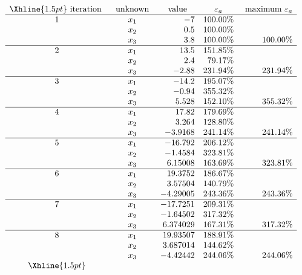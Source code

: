 \documentclass[../main.tex]{subfiles}
\begin{document}
\begin{enumerate}[label=\bfseries(\alph*)]
$\begin{array}{ccrrr}
\Xhline{1.5pt}\text { iteration } & \text { unknown } & \multicolumn{1}{c}{\text { value }} & \multicolumn{1}{c}{\varepsilon_{a}} & \text { maximum } \varepsilon_{a} \\
\hline 1 & x_{1} & -7 & 100.00 \% & \\
& x_{2} & 0.5 & 100.00 \% & \\
& x_{3} & 3.8 & 100.00 \% & 100.00 \% \\
\hline 2 & x_{1} & 13.5 & 151.85 \% & \\
& x_{2} & 2.4 & 79.17 \% & \\
& x_{3} & -2.88 & 231.94 \% & 231.94 \% \\
\hline 3 & x_{1} & -14.2 & 195.07 \% & \\
& x_{2} & -0.94 & 355.32 \% & \\
& x_{3} & 5.528 & 152.10 \% & 355.32 \% \\
\hline 4 & x_{1} & 17.82 & 179.69 \% & \\
& x_{2} & 3.264 & 128.80 \% & \\
& x_{3} & -3.9168 & 241.14 \% & 241.14 \% \\
\hline 5 & x_{1} & -16.792 & 206.12 \% & \\
& x_{2} & -1.4584 & 323.81 \% & \\
& x_{3} & 6.15008 & 163.69 \% & 323.81 \% \\
\hline 6 & x_{1} & 19.3752 & 186.67 \% & \\
& x_{2} & 3.57504 & 140.79 \% & \\
& x_{3} & -4.29005 & 243.36 \% & 243.36 \% \\
\hline 7 & x_{1} & -17.7251 & 209.31 \% & \\
& x_{2} & -1.64502 & 317.32 \% & \\
& x_{3} & 6.374029 & 167.31 \% & 317.32 \% \\
\hline 8 & x_{1} & 19.93507 & 188.91 \% & \\
& x_{2} & 3.687014 & 144.62 \% & \\
& x_{3} & -4.42442 & 244.06 \% & 244.06 \% \\
\Xhline{1.5pt}
\end{array}$
\bigbreak


\section{}


\end{enumerate}
\end{document}
